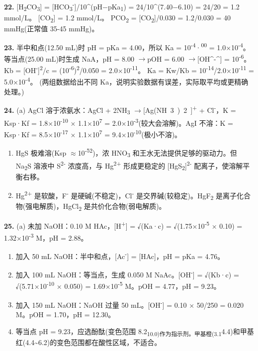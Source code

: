\documentclass[a4paper,11pt]{ctexart}
\newcommand{\箭}{\ensuremath{\rightarrow}}
\newcommand{\左箭}{\ensuremath{\leftarrow}}
\newcommand{\上箭}{\ensuremath{\uparrow}}
\newcommand{\下箭}{\ensuremath{\downarrow}}
\newcommand{\衡}{\ensuremath{\rightleftharpoons}}
\newcommand{\双箭}{\ensuremath{\leftrightarrow}}
\newcommand{\约等于}{\ensuremath{\approx}}
\newcommand{\小于等于}{\ensuremath{\leq}}
\newcommand{\大于等于}{\ensuremath{\geq}}
\newcommand{\不等于}{\ensuremath{\neq}}
\newcommand{\西格马}{\ensuremath{\sigma}}
\newcommand{\派}{\ensuremath{\pi}}
\begin{document}
\textbf{22.} {[}H\textsubscript{2}CO\textsubscript{3}{]} = {[}HCO\textsubscript{3}\textsuperscript{-}{]}/10\^{}(pH−pKa\textsubscript{1}) = 24/10\^{}(7.40−6.10) = 24/20 = 1.2 mmol/L。
{[}CO\textsubscript{2}{]} = 1.2 mmol/L。
PCO\textsubscript{2} = {[}CO\textsubscript{2}{]}/0.030 = 1.2/0.030 = 40 mmHg(正常值 35-45 mmHg)。

\textbf{23.} 半中和点(12.50 mL)时 pH = pKa = 4.00，所以 Ka = 10\textsuperscript{-4}·\textsuperscript{00} = 1.0×10\textsuperscript{-4}。
等当点(25.00 mL)时生成 NaA，pH = 8.00 \箭 pOH = 6.00 \箭 [OH^-^] = 10\textsuperscript{-6}。
Kb = {[}OH\textsuperscript{-}{]}\textsuperscript{2}/c = (10\textsuperscript{-6})\textsuperscript{2}/0.050 = 2.0×10\textsuperscript{-11}。
Ka = Kw/Kb = 10\textsuperscript{-14}/2.0×10\textsuperscript{-11} = 5.0×10\textsuperscript{-4}。
(两组数据给出不同 Ka，说明实验数据有误差，实际取平均或更精确处理。)

\textbf{24.}
(a) AgCl 溶于浓氨水：AgCl + 2NH\textsubscript{3} \箭 [Ag(NH~3~)~2~]\textsuperscript{+} + Cl\textsuperscript{-}，K = Ksp·Kf = 1.8×10\textsuperscript{-10} × 1.1×10\textsuperscript{7} = 2.0×10\textsuperscript{-3}(较大会溶解)。AgI 不溶：K = Ksp·Kf = 8.5×10\textsuperscript{-17} × 1.1×10\textsuperscript{7} = 9.4×10\textsuperscript{-10}(极小不溶)。

\begin{enumerate}
\def\labelenumi{(\alph{enumi})}
\setcounter{enumi}{1}
\item
  HgS 极难溶(Ksp \约等于 10\textsuperscript{-52})，浓 HNO\textsubscript{3} 和王水无法提供足够的驱动力。但 Na\textsubscript{2}S 溶液中 S\textsuperscript{2-} 浓度高，与 Hg\textsuperscript{2+} 形成更稳定的 {[}HgS\textsubscript{2}{]}\textsuperscript{2-} 配离子，使溶解平衡右移。
\item
  Hg\textsuperscript{2+} 是软酸，F\textsuperscript{-} 是硬碱(不稳定)，Cl\textsuperscript{-} 是交界碱(较稳定)。HgF\textsubscript{2} 是离子化合物(强电解质)，HgCl\textsubscript{2} 是共价化合物(弱电解质)。
\end{enumerate}

\textbf{25.}
(a) 未加 NaOH：0.10 M HAc，{[}H\textsuperscript{+}{]} = √(Ka·c) = √(1.75×10\textsuperscript{-5} × 0.10) = 1.32×10\textsuperscript{-3} M，pH = 2.88。

\begin{enumerate}
\def\labelenumi{(\alph{enumi})}
\setcounter{enumi}{1}
\item
  加入 50 mL NaOH：半中和点，{[}Ac\textsuperscript{-}{]} = {[}HAc{]}，pH = pKa = 4.76。
\item
  加入 100 mL NaOH：等当点，生成 0.050 M NaAc。{[}OH\textsuperscript{-}{]} = √(Kb·c) = √(5.71×10\textsuperscript{-10} × 0.050) = 1.69×10\textsuperscript{-5} M。pOH = 4.77，pH = 9.23。
\item
  加入 150 mL NaOH：NaOH 过量 50 mL。{[}OH\textsuperscript{-}{]} = 0.10 × 50/250 = 0.020 M。pOH = 1.70，pH = 12.30。
\item
  等当点 pH = 9.23，应选酚酞(变色范围 8.2\textsubscript{10.0)作为指示剂。甲基橙(3.1}4.4)和甲基红(4.4\textasciitilde6.2)的变色范围都在酸性区域，不适合。
\end{enumerate}
\end{document}
